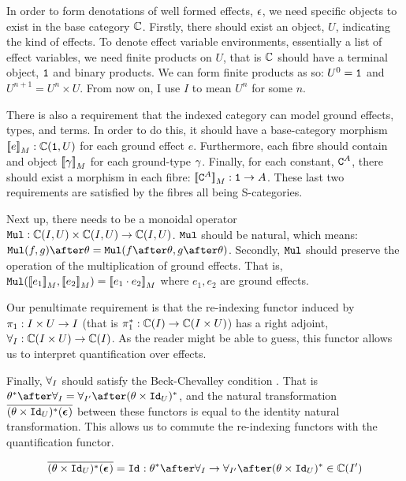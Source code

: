 \documentclass{Report}
\begin{document}
In order to form denotations of well formed effects, $\epsilon$, we need specific objects to exist in the base category $\mathbb{C}$. Firstly, there should exist an object, $U$, indicating the kind of effects. To denote effect variable environments, essentially a list of effect variables, we need finite products on $U$, that is $\mathbb{C}$ should have a terminal object, $\texttt{1}$ and binary products. We can form finite products as so: $U^0 = \texttt{1}$ and $U^{n+1} = U^n\times U$. From now on, I use $I$ to mean $U^n$ for some $n$.

There is also a requirement that the indexed category can model ground effects, types, and terms. In order to do this, it should have a base-category morphism ${\bf [\![}e{\bf ]\!]}_M: \mathbb{C}(\texttt{1}, U)$ for each ground effect $e$. Furthermore, each fibre should contain and object ${\bf [\![}\gamma{\bf ]\!]}_M$ for each ground-type $\gamma$. Finally, for each constant, $\texttt{C}^{A}$, there should exist a morphism in each fibre: ${\bf [\![}\texttt{C}^{A}{\bf ]\!]}_M: \texttt{1} \rightarrow A$. These last two requirements are satisfied by the fibres all being S-categories.

Next up, there needs to be a monoidal operator $\texttt{Mul}: \mathbb{C}(I, U) \times \mathbb{C}(I, U) \rightarrow \mathbb{C}(I, U)$. $\texttt{Mul}$ should be natural, which means: $\Mul(f, g)\after\theta = \Mul(f\after\theta, g\after\theta)$. Secondly, $\texttt{Mul}$ should preserve the operation of the multiplication of ground effects. That is, $\texttt{Mul}({\bf [\![}e_1{\bf ]\!]}_M,{\bf [\![}e_2{\bf ]\!]}_M) = {\bf [\![}e_1\cdot e_2{\bf ]\!]}_M$ where $e_1, e_2$ are ground effects.

Our penultimate requirement is that the re-indexing functor  induced by $\pi_1: I\times U\rightarrow I$ (that is $\pi_1^*: \mathbb{C}(I) \rightarrow \mathbb{C}(I\times U)$) has a right adjoint, $\forall_I: \mathbb{C}(I\times U) \rightarrow \mathbb{C}(I)$. As the reader might be able to guess, this functor allows us to interpret quantification over effects.

Finally, $\forall_I$ should satisfy the Beck-Chevalley condition . That is $\theta\star\after\allI = \allII\after(\theta\times\Id{U})\star$, and the natural transformation $\overline{(\theta\times\texttt{Id}_{U})^*(\boldsymbol{\epsilon}_{})}$ between these functors is equal to the identity natural transformation. This allows us to commute the re-indexing functors with the quantification functor.

\begin{align}
    \bar{(\theta\times\Id{U})\star(\counit{})} = \Id{}: \theta\star\after\allI \rightarrow \allII\after(\theta\times\Id{U})\star\in \C(I')
\end{align}
\end{document}
